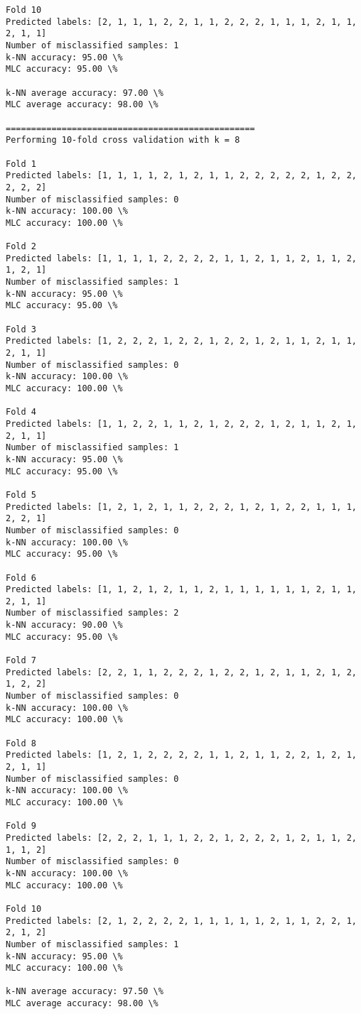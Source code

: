 \documentclass[11pt]{article}
\begin{document}
\begin{Verbatim}[commandchars=\\\{\}]
Fold 10
Predicted labels: [2, 1, 1, 1, 2, 2, 1, 1, 2, 2, 2, 1, 1, 1, 2, 1, 1, 2, 1, 1]
Number of misclassified samples: 1
k-NN accuracy: 95.00 \%
MLC accuracy: 95.00 \%

k-NN average accuracy: 97.00 \%
MLC average accuracy: 98.00 \%

=================================================
Performing 10-fold cross validation with k = 8

Fold 1
Predicted labels: [1, 1, 1, 1, 2, 1, 2, 1, 1, 2, 2, 2, 2, 2, 1, 2, 2, 2, 2, 2]
Number of misclassified samples: 0
k-NN accuracy: 100.00 \%
MLC accuracy: 100.00 \%

Fold 2
Predicted labels: [1, 1, 1, 1, 2, 2, 2, 2, 1, 1, 2, 1, 1, 2, 1, 1, 2, 1, 2, 1]
Number of misclassified samples: 1
k-NN accuracy: 95.00 \%
MLC accuracy: 95.00 \%

Fold 3
Predicted labels: [1, 2, 2, 2, 1, 2, 2, 1, 2, 2, 1, 2, 1, 1, 2, 1, 1, 2, 1, 1]
Number of misclassified samples: 0
k-NN accuracy: 100.00 \%
MLC accuracy: 100.00 \%

Fold 4
Predicted labels: [1, 1, 2, 2, 1, 1, 2, 1, 2, 2, 2, 1, 2, 1, 1, 2, 1, 2, 1, 1]
Number of misclassified samples: 1
k-NN accuracy: 95.00 \%
MLC accuracy: 95.00 \%

Fold 5
Predicted labels: [1, 2, 1, 2, 1, 1, 2, 2, 2, 1, 2, 1, 2, 2, 1, 1, 1, 2, 2, 1]
Number of misclassified samples: 0
k-NN accuracy: 100.00 \%
MLC accuracy: 95.00 \%

Fold 6
Predicted labels: [1, 1, 2, 1, 2, 1, 1, 2, 1, 1, 1, 1, 1, 1, 2, 1, 1, 2, 1, 1]
Number of misclassified samples: 2
k-NN accuracy: 90.00 \%
MLC accuracy: 95.00 \%

Fold 7
Predicted labels: [2, 2, 1, 1, 2, 2, 2, 1, 2, 2, 1, 2, 1, 1, 2, 1, 2, 1, 2, 2]
Number of misclassified samples: 0
k-NN accuracy: 100.00 \%
MLC accuracy: 100.00 \%

Fold 8
Predicted labels: [1, 2, 1, 2, 2, 2, 2, 1, 1, 2, 1, 1, 2, 2, 1, 2, 1, 2, 1, 1]
Number of misclassified samples: 0
k-NN accuracy: 100.00 \%
MLC accuracy: 100.00 \%

Fold 9
Predicted labels: [2, 2, 2, 1, 1, 1, 2, 2, 1, 2, 2, 2, 1, 2, 1, 1, 2, 1, 1, 2]
Number of misclassified samples: 0
k-NN accuracy: 100.00 \%
MLC accuracy: 100.00 \%

Fold 10
Predicted labels: [2, 1, 2, 2, 2, 2, 1, 1, 1, 1, 1, 2, 1, 1, 2, 2, 1, 2, 1, 2]
Number of misclassified samples: 1
k-NN accuracy: 95.00 \%
MLC accuracy: 100.00 \%

k-NN average accuracy: 97.50 \%
MLC average accuracy: 98.00 \%


\end{Verbatim}
\end{document}
